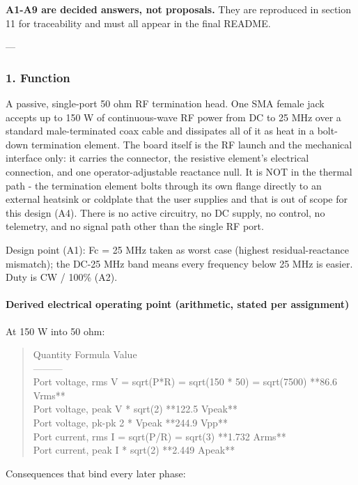 \documentclass[11pt,a4paper]{article}
\begin{document}
\textbf{A1-A9 are decided answers, not proposals.} They are reproduced in section 11 for traceability and must all appear in the final README.

---

\subsubsection*{1. Function}
A passive, single-port 50 ohm RF termination head. One SMA female jack accepts up to 150 W of continuous-wave RF power from DC to 25 MHz over a standard male-terminated coax cable and dissipates all of it as heat in a bolt-down termination element. The board itself is the RF launch and the mechanical interface only: it carries the connector, the resistive element's electrical connection, and one operator-adjustable reactance null. It is NOT in the thermal path - the termination element bolts through its own flange directly to an external heatsink or coldplate that the user supplies and that is out of scope for this design (A4). There is no active circuitry, no DC supply, no control, no telemetry, and no signal path other than the single RF port.

Design point (A1): Fc = 25 MHz taken as worst case (highest residual-reactance mismatch); the DC-25 MHz band means every frequency below 25 MHz is easier. Duty is CW / 100\% (A2).

\paragraph*{Derived electrical operating point (arithmetic, stated per assignment)}
At 150 W into 50 ohm:

\begin{quote}\small\ttfamily\raggedright
\textbar{} Quantity \textbar{} Formula \textbar{} Value \textbar{}\\
\textbar{}---\textbar{}---\textbar{}---\textbar{}\\
\textbar{} Port voltage, rms \textbar{} V = sqrt(P{*}R) = sqrt(150 {*} 50) = sqrt(7500) \textbar{} {*}{*}86.6 Vrms{*}{*} \textbar{}\\
\textbar{} Port voltage, peak \textbar{} V {*} sqrt(2) \textbar{} {*}{*}122.5 Vpeak{*}{*} \textbar{}\\
\textbar{} Port voltage, pk-pk \textbar{} 2 {*} Vpeak \textbar{} {*}{*}244.9 Vpp{*}{*} \textbar{}\\
\textbar{} Port current, rms \textbar{} I = sqrt(P/R) = sqrt(3) \textbar{} {*}{*}1.732 Arms{*}{*} \textbar{}\\
\textbar{} Port current, peak \textbar{} I {*} sqrt(2) \textbar{} {*}{*}2.449 Apeak{*}{*} \textbar{}
\end{quote}
Consequences that bind every later phase:
\end{document}
